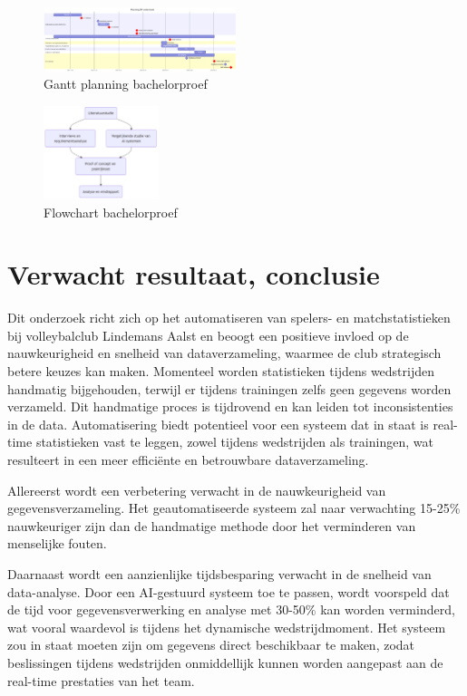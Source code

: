 \begin{figure}[ht]
  \centering
  \includegraphics[width=0.5\textwidth]{img/gantt.png}
  \caption{\label{fig:gantt}Gantt planning bachelorproef}
\end{figure}

\begin{figure}[ht]
  \centering
  \includegraphics[width=0.3\textwidth]{img/flowchart.png}
  \caption{\label{fig:flowchart}Flowchart bachelorproef}
\end{figure}

\section{Verwacht resultaat, conclusie}%
\label{sec:verwachte_resultaten}

Dit onderzoek richt zich op het automatiseren van spelers- en matchstatistieken bij volleybalclub Lindemans Aalst en beoogt een positieve invloed op de nauwkeurigheid en snelheid van dataverzameling, waarmee de club strategisch betere keuzes kan maken. Momenteel worden statistieken tijdens wedstrijden handmatig bijgehouden, terwijl er tijdens trainingen zelfs geen gegevens worden verzameld. Dit handmatige proces is tijdrovend en kan leiden tot inconsistenties in de data. Automatisering biedt potentieel voor een systeem dat in staat is real-time statistieken vast te leggen, zowel tijdens wedstrijden als trainingen, wat resulteert in een meer efficiënte en betrouwbare dataverzameling.

Allereerst wordt een verbetering verwacht in de nauwkeurigheid van gegevensverzameling. Het geautomatiseerde systeem zal naar verwachting 15-25\% nauwkeuriger zijn dan de handmatige methode door het verminderen van menselijke fouten. 

Daarnaast wordt een aanzienlijke tijdsbesparing verwacht in de snelheid van data-analyse. Door een AI-gestuurd systeem toe te passen, wordt voorspeld dat de tijd voor gegevensverwerking en analyse met 30-50\% kan worden verminderd, wat vooral waardevol is tijdens het dynamische wedstrijdmoment. Het systeem zou in staat moeten zijn om gegevens direct beschikbaar te maken, zodat beslissingen tijdens wedstrijden onmiddellijk kunnen worden aangepast aan de real-time prestaties van het team.

